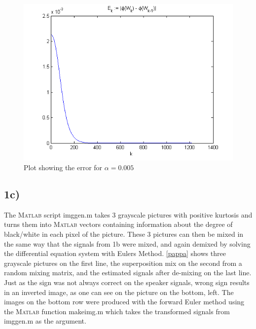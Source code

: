 \begin{figure}
\includegraphics[scale=0.86]{error0005.png}
\caption{Plot showing the error for $\alpha=0.005$}
\label{0005}
\end{figure}


\clearpage
\subsection*{1c)}

The \textsc{Matlab} script imggen.m takes 3 grayscale pictures with positive kurtosis and turns them into \textsc{Matlab} vectors containing information about the degree of black/white in each pixel of the picture. These 3 pictures can then be mixed in the same way that the signals from 1b were mixed, and again demixed by solving the differential equation system with Eulers Method.
\cref{pappa} shows three grayscale pictures on the first line, the superposition mix on the second from a random mixing matrix, and the estimated signals after de-mixing on the last line. Just as the sign was not always correct on the speaker signals, wrong sign results in an inverted image, as one can see on the picture on the bottom, left. The images on the bottom row were produced with the forward Euler method using the \textsc{Matlab} function makeimg.m which takes the transformed signals from imggen.m as the argument.


